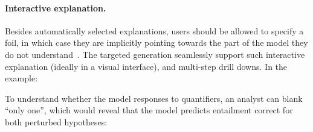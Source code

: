 \paragraph{Interactive explanation.}
Besides automatically selected explanations, users should be allowed to specify a foil, in which case they are implicitly pointing towards the part of the model they do not understand~\cite{miller}.
The targeted generation seamlessly support such interactive explanation (ideally in a visual interface), and multi-step drill downs.
In the example: 


To understand whether the model responses to quantifiers, an analyst can blank ``only one'', which would reveal that the model predicts entailment correct for both perturbed hypotheses:


